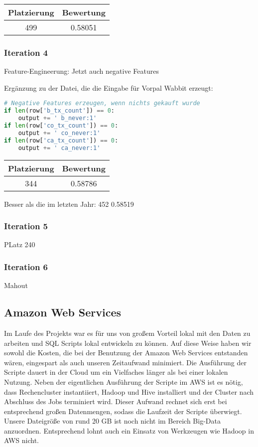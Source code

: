 \begin{tabular}{|c|c|}
	\hline \textbf{Platzierung} & \textbf{Bewertung} \\ 
	\hline 499 & 0.58051  \\ 
	\hline 
\end{tabular}

\subsubsection{Iteration 4}

Feature-Engineerung: Jetzt auch negative Features

Ergänzung zu der Datei, die die Eingabe für Vorpal Wabbit erzeugt:
\begin{lstlisting}[language=Python]
# Negative Features erzeugen, wenn nichts gekauft wurde
if len(row['b_tx_count']) == 0:
	output += ' b_never:1'
if len(row['co_tx_count']) == 0:
	output += ' co_never:1'
if len(row['ca_tx_count']) == 0:
	output += ' ca_never:1'
\end{lstlisting}

\begin{tabular}{|c|c|}
	\hline \textbf{Platzierung} & \textbf{Bewertung} \\ 
	\hline 344 & 0.58786  \\ 
	\hline 
\end{tabular}

Besser als die im letzten Jahr: 452 0.58519

\subsubsection{Iteration 5}

PLatz 240

\subsubsection{Iteration 6}

Mahout


	
\subsection{Amazon Web Services}
Im Laufe des Projekts war es für uns von großem Vorteil lokal mit den Daten zu arbeiten und SQL Scripts lokal entwickeln zu können. Auf diese Weise haben wir sowohl die Kosten, die bei der Benutzung der Amazon Web Services entstanden wären, eingespart als auch unseren Zeitaufwand minimiert. Die Ausführung der Scripte dauert in der Cloud um ein Vielfaches länger als bei einer lokalen Nutzung. Neben der eigentlichen Ausführung der Scripte im AWS ist es nötig, dass Rechencluster instantiiert, Hadoop und Hive installiert und der Cluster nach Abschluss des Jobs terminiert wird. Dieser Aufwand rechnet sich erst bei entsprechend großen Datenmengen, sodass die Laufzeit der Scripte überwiegt. Unsere Dateigröße von rund 20 GB ist noch nicht im Bereich Big-Data anzuordnen. Entsprechend lohnt auch ein Einsatz von Werkzeugen wie Hadoop in AWS nicht.

